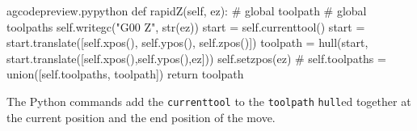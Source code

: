 \documentclass{ltxdoc}
\begin{document}
\lstset{firstnumber=\thegcpy}
\begin{writecode}{a}{gcodepreview.py}{python}
    def rapidZ(self, ez):
#        global toolpath
#        global toolpaths
        self.writegc("G00 Z", str(ez))
        start = self.currenttool()
        start = start.translate([self.xpos(), self.ypos(), self.zpos()])
        toolpath = hull(start, start.translate([self.xpos(),self.ypos(),ez]))
        self.setzpos(ez)
#        self.toolpaths = union([self.toolpaths, toolpath])
        return toolpath
        
\end{writecode}
\addtocounter{gcpy}{11}

The Python commands  add the \verb|currenttool| to the \verb|toolpath| \verb|hull|ed together at the current position and the end position of the move.
\end{document}
